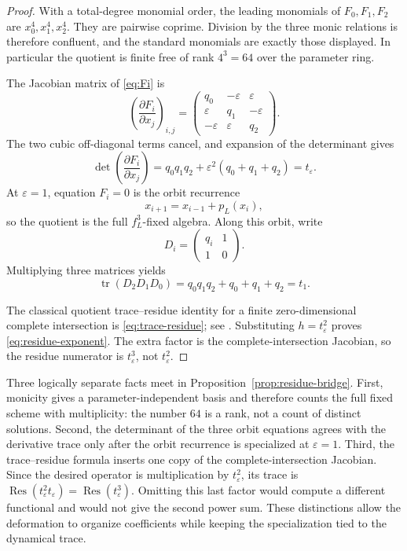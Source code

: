 \documentclass[11pt]{article}
\theoremstyle{definition}
\newcommand{\tr}{\operatorname{tr}}
\newcommand{\Res}{\operatorname{Res}}
\begin{document}
{\begin{proof}
With a total-degree monomial order, the leading monomials of $F_0,F_1,F_2$ are $x_0^4,x_1^4,x_2^4$. They are pairwise coprime. Division by the three monic relations is therefore confluent, and the standard monomials are exactly those displayed. In particular the quotient is finite free of rank $4^3=64$ over the parameter ring.

The Jacobian matrix of \eqref{eq:Fi} is
\[
\left(\frac{\partial F_i}{\partial x_j}\right)_{i,j}
=
\begin{pmatrix}
q_0&-\varepsilon&\varepsilon\\
\varepsilon&q_1&-\varepsilon\\
-\varepsilon&\varepsilon&q_2
\end{pmatrix}.
\]
The two cubic off-diagonal terms cancel, and expansion of the determinant gives
\[
\det\left(\frac{\partial F_i}{\partial x_j}\right)
=q_0q_1q_2+\varepsilon^2(q_0+q_1+q_2)
=t_\varepsilon.
\]
At $\varepsilon=1$, equation $F_i=0$ is the orbit recurrence
\[
x_{i+1}=x_{i-1}+p_L(x_i),
\]
so the quotient is the full $f_L^3$-fixed algebra. Along this orbit, write
\[
D_i=
\begin{pmatrix}q_i&1\\1&0\end{pmatrix}.
\]
Multiplying three matrices yields
\[
\tr(D_2D_1D_0)=q_0q_1q_2+q_0+q_1+q_2=t_1.
\]

The classical quotient trace--residue identity for a finite zero-dimensional complete intersection is \eqref{eq:trace-residue}; see \cite{CattaniDickensteinSturmfels1996}. Substituting $h=t_\varepsilon^2$ proves \eqref{eq:residue-exponent}. The extra factor is the complete-intersection Jacobian, so the residue numerator is $t_\varepsilon^3$, not $t_\varepsilon^2$.
\end{proof}

Three logically separate facts meet in Proposition~\ref{prop:residue-bridge}. First, monicity gives a parameter-independent basis and therefore counts the full fixed scheme with multiplicity: the number $64$ is a rank, not a count of distinct solutions. Second, the determinant of the three orbit equations agrees with the derivative trace only after the orbit recurrence is specialized at $\varepsilon=1$. Third, the trace--residue formula inserts one copy of the complete-intersection Jacobian. Since the desired operator is multiplication by $t_\varepsilon^2$, its trace is $\Res(t_\varepsilon^2t_\varepsilon)=\Res(t_\varepsilon^3)$. Omitting this last factor would compute a different functional and would not give the second power sum. These distinctions allow the deformation to organize coefficients while keeping the specialization tied to the dynamical trace.

}
\end{document}
